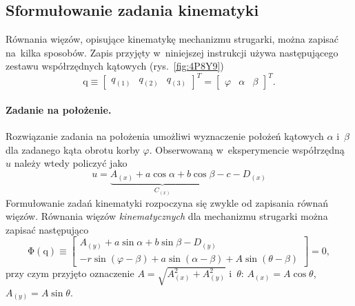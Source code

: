 \documentclass[paper=a4,DIV=12]{tmmlab}
\newcommand{\brm}[1]{\bm{\mathrm{#1}}}
\begin{document}
\cleardoublepage

\begin{appendices}
  \section{Sformułowanie zadania kinematyki}
  \label{sec:702WE}
  Równania więzów, opisujące kinematykę mechanizmu strugarki, można zapisać
  na~kilka sposobów. Zapis przyjęty w~niniejszej instrukcji używa następującego
  zestawu współrzędnych kątowych (rys.~\ref{fig:4P8Y9})
  \begin{equation}
    \brm{q} \equiv \begin{bmatrix} q_{(1)} & q_{(2)} & q_{(3)} \end{bmatrix}^T
                    = \begin{bmatrix} \varphi & \alpha  & \beta   \end{bmatrix}^T.
    \label{eq:CBF4Z}
  \end{equation}

  \paragraph{Zadanie na położenie.}

  Rozwiązanie zadania na położenia umożliwi wyznaczenie położeń kątowych $\alpha$
  i~$\beta$ dla zadanego kąta obrotu korby $\varphi$. Obserwowaną
  w~eksperymencie współrzędną $u$ należy wtedy policzyć jako
  \begin{equation}
    u = \underbrace{A_{(x)} + a \cos{\alpha} + b \cos{\beta}}_{C_{(x)}} - c - D_{(x)}
    \label{eq:R3C32}
  \end{equation}
  Formułowanie zadań kinematyki rozpoczyna się zwykle od zapisania równań
  więzów. Równania więzów \emph{kinematycznych} dla mechanizmu strugarki można
  zapisać następująco
  \begin{equation}
    \brm{\Phi}(\brm{q}) \equiv \begin{bmatrix}
      A_{(y)} + a \sin{\alpha} + b \sin{\beta} - D_{(y)} \\
     -r \sin{(\varphi-\beta)} + a \sin{(\alpha - \beta)} + A \sin{(\theta - \beta)}
    \end{bmatrix} = \brm{0},
    \label{eq:V1TFC}
  \end{equation}
  przy czym przyjęto oznaczenie $A = \sqrt{A_{(x)}^2 + A_{(y)}^2}$ i~$\theta$:
  $A_{(x)} = A\cos{\theta}$, $A_{(y)} = A \sin{\theta}$.


\end{appendices}
\end{document}
